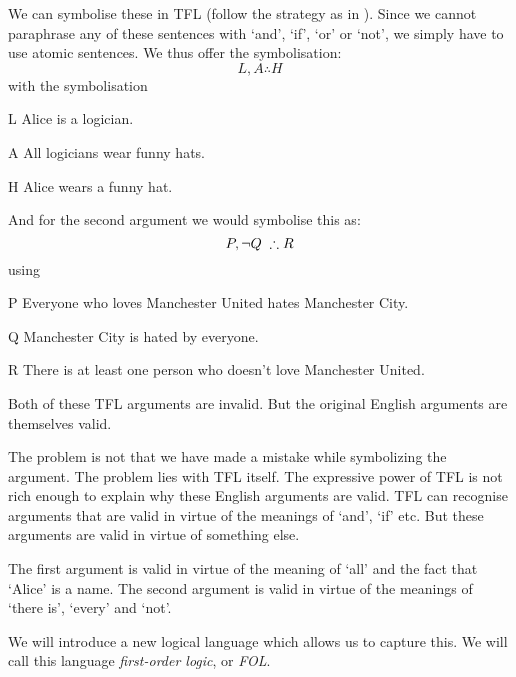 We can symbolise these in TFL (follow the strategy as in \pageref{s:SymbolisingComplexTFL}). Since we cannot paraphrase any of these sentences with `and', `if', `or' or `not', we simply have to use atomic sentences. We thus offer the symbolisation:
$$L, A \therefore H$$
with the symbolisation
\begin{ekey}
\item[L] Alice is a logician.
\item[A] All logicians wear funny hats.
\item[H] Alice wears a funny hat.
\end{ekey}

And for the second argument we would symbolise this as:
\begin{equation*}
P, \enot Q\; \therefore R
\end{equation*}
using
\begin{ekey}
\item[P] Everyone who loves Manchester United hates Manchester City.
\item[Q] Manchester City is hated by everyone.
\item[R] There is at least one person who doesn't love Manchester United.
\end{ekey}

Both of these TFL arguments are invalid. But the original English arguments are themselves valid.



The problem is not that we have made a mistake while symbolizing the argument. The problem lies with TFL itself.
The expressive power of TFL is not rich enough to explain why these English arguments are valid.
TFL can recognise arguments that are valid in virtue of the meanings of `and', `if' etc. But these arguments are valid in virtue of something else.

The first argument is valid in virtue of the meaning of `all' and the fact that `Alice' is a name. The second argument is valid in virtue of the meanings of `there is', `every' and `not'.

We will introduce a new logical language which allows us to capture this. We will call this language \emph{first-order logic}, or \emph{FOL}.

